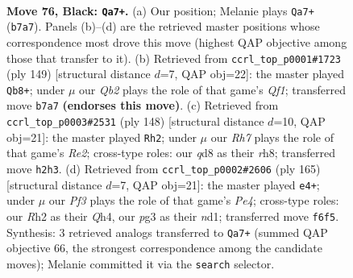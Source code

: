 \documentclass[11pt]{article}
\begin{document}
\clearpage

\begin{figure}[p]\centering
\begin{subfigure}{0.46\textwidth}\centering
\resizebox{\linewidth}{!}{%
\newchessgame
\chessboard[
  setfen={3Q4/1q6/5pk1/8/8/4K1P1/7r/8 b - - 3 76},
  showmover=false,
  pgfstyle=straightmove, color=movearrow, markmove={b7-a7}
]}
\caption{}
\end{subfigure}\hfill
\begin{subfigure}{0.46\textwidth}\centering
\resizebox{\linewidth}{!}{%
\newchessgame
\chessboard[
  setfen={5q2/3Q4/8/5pk1/8/1P6/7K/8 b - - 9 75},
  showmover=false,
  pgfstyle=straightmove, color=movearrow, markmove={f8-b8}
]}
\caption{}
\end{subfigure}
\\[4pt]
\begin{subfigure}{0.46\textwidth}\centering
\resizebox{\linewidth}{!}{%
\newchessgame
\chessboard[
  setfen={7r/5p2/3k3P/6K1/8/8/4R3/8 w - - 42 75},
  showmover=false,
  pgfstyle=straightmove, color=movearrow, markmove={e2-h2}
]}
\caption{}
\end{subfigure}\hfill
\begin{subfigure}{0.46\textwidth}\centering
\resizebox{\linewidth}{!}{%
\newchessgame
\chessboard[
  setfen={8/8/4k3/2Q1p3/7q/5K2/8/3N4 b - - 5 83},
  showmover=false,
  pgfstyle=straightmove, color=movearrow, markmove={e5-e4}
]}
\caption{}
\end{subfigure}
\caption{\textbf{Move 76, Black: \texttt{Qa7+}.} (a) Our position; Melanie plays \texttt{Qa7+} (\texttt{b7a7}). Panels (b)--(d) are the retrieved master positions whose correspondence most drove this move (highest QAP objective among those that transfer to it). (b) Retrieved from \texttt{ccrl\_top\_p0001\#1723} (ply 149) [structural distance $d$=7, QAP obj=22]: the master played \texttt{Qb8+}; under $\mu$ our \emph{Qb2} plays the role of that game's \emph{Qf1}; transferred move \texttt{b7a7} \textbf{(endorses this move)}. (c) Retrieved from \texttt{ccrl\_top\_p0003\#2531} (ply 148) [structural distance $d$=10, QAP obj=21]: the master played \texttt{Rh2}; under $\mu$ our \emph{Rh7} plays the role of that game's \emph{Re2}; cross-type roles: our \emph{q}d8 as their \emph{r}h8; transferred move \texttt{h2h3}. (d) Retrieved from \texttt{ccrl\_top\_p0002\#2606} (ply 165) [structural distance $d$=7, QAP obj=21]: the master played \texttt{e4+}; under $\mu$ our \emph{Pf3} plays the role of that game's \emph{Pe4}; cross-type roles: our \emph{R}h2 as their \emph{Q}h4, our \emph{p}g3 as their \emph{n}d1; transferred move \texttt{f6f5}. Synthesis: 3 retrieved analogs transferred to \texttt{Qa7+} (summed QAP objective 66, the strongest correspondence among the candidate moves); Melanie committed it via the \texttt{search} selector.}
\label{fig:thought-m151}
\end{figure}
\end{document}
